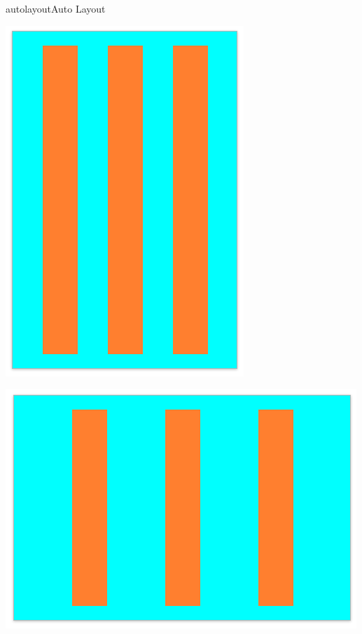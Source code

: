 \documentclass[parskip=half, final]{scrreprt}
\begin{document}
\begin{lecture}
\begin{exc}
\begin{excitem}{autolayout}{Auto Layout}
\begin{enumerate}
\begin{minipage}{.5\linewidth}
  \centering
  \includegraphics[width=\linewidth, height=\linewidth, keepaspectratio]{img/al_02.png}
\end{minipage}
\begin{minipage}{.5\linewidth}
  \centering
  \includegraphics[width=\linewidth, height=\linewidth, keepaspectratio]{img/al_01.png}
\end{minipage}

\end{enumerate}

\end{excitem}

\end{exc}


\end{lecture}
\end{document}
